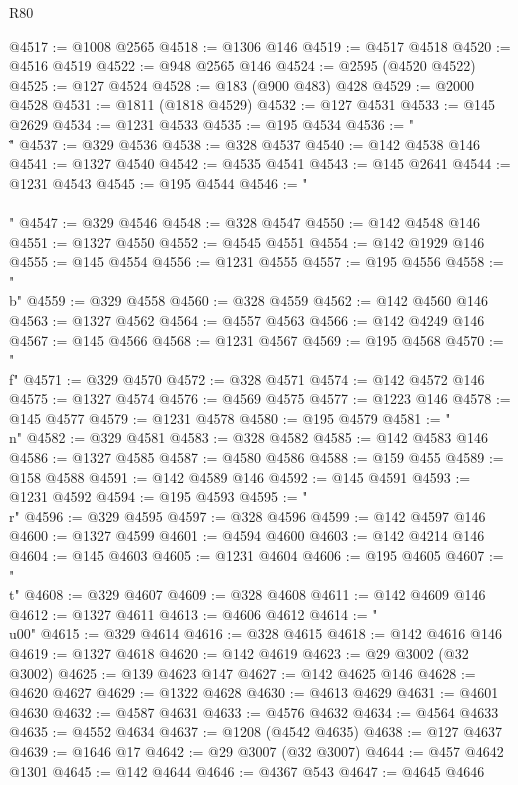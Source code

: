 \begin{lexlean}{R80}
\begin{coremodule}
@4517 := @1008 @2565
@4518 := @1306 @146
@4519 := @4517 @4518
@4520 := @4516 @4519
@4522 := @948 @2565 @146
@4524 := @2595 (@4520 @4522)
@4525 := @127 @4524
@4528 := @183 (@900 @483) @428
@4529 := @2000 @4528
@4531 := @1811 (@1818 @4529)
@4532 := @127 @4531
@4533 := @145 @2629
@4534 := @1231 @4533
@4535 := @195 @4534
@4536 := "\\\""
@4537 := @329 @4536
@4538 := @328 @4537
@4540 := @142 @4538 @146
@4541 := @1327 @4540
@4542 := @4535 @4541
@4543 := @145 @2641
@4544 := @1231 @4543
@4545 := @195 @4544
@4546 := "\\\\"
@4547 := @329 @4546
@4548 := @328 @4547
@4550 := @142 @4548 @146
@4551 := @1327 @4550
@4552 := @4545 @4551
@4554 := @142 @1929 @146
@4555 := @145 @4554
@4556 := @1231 @4555
@4557 := @195 @4556
@4558 := "\\b"
@4559 := @329 @4558
@4560 := @328 @4559
@4562 := @142 @4560 @146
@4563 := @1327 @4562
@4564 := @4557 @4563
@4566 := @142 @4249 @146
@4567 := @145 @4566
@4568 := @1231 @4567
@4569 := @195 @4568
@4570 := "\\f"
@4571 := @329 @4570
@4572 := @328 @4571
@4574 := @142 @4572 @146
@4575 := @1327 @4574
@4576 := @4569 @4575
@4577 := @1223 @146
@4578 := @145 @4577
@4579 := @1231 @4578
@4580 := @195 @4579
@4581 := "\\n"
@4582 := @329 @4581
@4583 := @328 @4582
@4585 := @142 @4583 @146
@4586 := @1327 @4585
@4587 := @4580 @4586
@4588 := @159 @455
@4589 := @158 @4588
@4591 := @142 @4589 @146
@4592 := @145 @4591
@4593 := @1231 @4592
@4594 := @195 @4593
@4595 := "\\r"
@4596 := @329 @4595
@4597 := @328 @4596
@4599 := @142 @4597 @146
@4600 := @1327 @4599
@4601 := @4594 @4600
@4603 := @142 @4214 @146
@4604 := @145 @4603
@4605 := @1231 @4604
@4606 := @195 @4605
@4607 := "\\t"
@4608 := @329 @4607
@4609 := @328 @4608
@4611 := @142 @4609 @146
@4612 := @1327 @4611
@4613 := @4606 @4612
@4614 := "\\u00"
@4615 := @329 @4614
@4616 := @328 @4615
@4618 := @142 @4616 @146
@4619 := @1327 @4618
@4620 := @142 @4619
@4623 := @29 @3002 (@32 @3002)
@4625 := @139 @4623 @147
@4627 := @142 @4625 @146
@4628 := @4620 @4627
@4629 := @1322 @4628
@4630 := @4613 @4629
@4631 := @4601 @4630
@4632 := @4587 @4631
@4633 := @4576 @4632
@4634 := @4564 @4633
@4635 := @4552 @4634
@4637 := @1208 (@4542 @4635)
@4638 := @127 @4637
@4639 := @1646 @17
@4642 := @29 @3007 (@32 @3007)
@4644 := @457 @4642 @1301
@4645 := @142 @4644
@4646 := @4367 @543
@4647 := @4645 @4646

\end{coremodule}
\end{lexlean}
